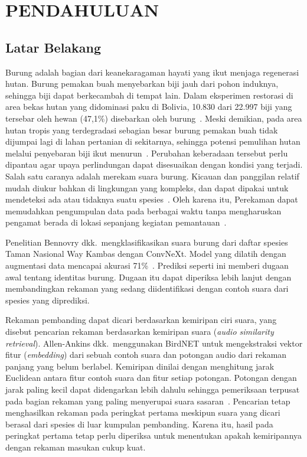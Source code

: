 \chapter{PENDAHULUAN}

\section{Latar Belakang}
Burung adalah bagian dari keanekaragaman hayati yang ikut menjaga
regenerasi hutan. Burung pemakan buah menyebarkan biji jauh dari pohon
induknya, sehingga biji dapat berkecambah di tempat lain. Dalam
eksperimen restorasi di area bekas hutan yang didominasi paku di Bolivia,
10.830 dari 22.997 biji yang tersebar oleh hewan (47,1\%) disebarkan
oleh burung~\cite{mayta2024seedrain}. Meski demikian, pada area hutan
tropis yang terdegradasi sebagian besar burung pemakan buah tidak
dijumpai lagi di lahan pertanian di sekitarnya, sehingga potensi
pemulihan hutan melalui penyebaran biji ikut
menurun~\cite{hatfield2024seeddispersal}. Perubahan keberadaan tersebut
perlu dipantau agar upaya perlindungan dapat disesuaikan dengan kondisi
yang terjadi. Salah satu caranya adalah merekam suara burung. Kicauan
dan panggilan relatif mudah diukur bahkan di lingkungan yang kompleks,
dan dapat dipakai untuk mendeteksi ada atau tidaknya suatu
spesies~\cite{lewis2021vocalizations,stowell2022bioacoustics}. Oleh karena itu, Perekaman dapat memudahkan pengumpulan data pada berbagai waktu tanpa
mengharuskan pengamat berada di lokasi sepanjang kegiatan
pemantauan~\cite{ningrum2026cikaniki}.

Penelitian Bennovry dkk.\ mengklasifikasikan suara burung dari daftar spesies
Taman Nasional Way Kambas dengan ConvNeXt. Model yang dilatih dengan
augmentasi data mencapai akurasi
71\%~\cite{bennovry2025waykambas}. Prediksi seperti ini memberi dugaan
awal tentang identitas burung. Dugaan itu dapat diperiksa lebih lanjut
dengan membandingkan rekaman yang sedang diidentifikasi dengan contoh
suara dari spesies yang diprediksi.

Rekaman pembanding dapat dicari berdasarkan kemiripan ciri suara, yang
disebut pencarian rekaman berdasarkan kemiripan suara (\textit{audio
similarity retrieval}). Allen-Ankins dkk.\ menggunakan BirdNET untuk
mengekstraksi vektor fitur (\textit{embedding}) dari sebuah contoh suara
dan potongan audio dari rekaman panjang yang belum berlabel. Kemiripan
dinilai dengan menghitung jarak Euclidean antara fitur contoh suara dan
fitur setiap potongan. Potongan dengan jarak paling kecil dapat
didengarkan lebih dahulu sehingga pemeriksaan terpusat pada bagian
rekaman yang paling menyerupai suara
sasaran~\cite{allenankins2025retrieval}. Pencarian tetap menghasilkan
rekaman pada peringkat pertama meskipun suara yang dicari berasal dari
spesies di luar kumpulan pembanding. Karena itu, hasil pada peringkat
pertama tetap perlu diperiksa untuk menentukan apakah kemiripannya
dengan rekaman masukan cukup kuat.

